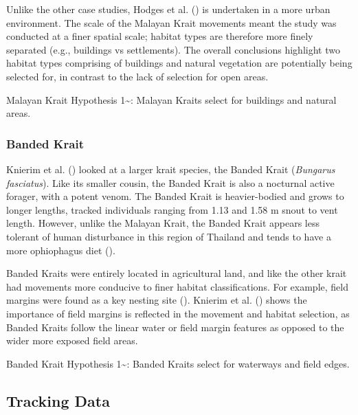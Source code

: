 \documentclass[10pt,a4paper]{article}
\begin{document}
Unlike the other case studies, Hodges et al. () is undertaken in a more urban environment.
The scale of the Malayan Krait movements meant the study was conducted at a finer spatial scale; habitat types are therefore more finely separated (e.g., buildings vs settlements).
The overall conclusions highlight two habitat types comprising of buildings and natural vegetation are potentially being selected for, in contrast to the lack of selection for open areas.

Malayan Krait Hypothesis 1\textasciitilde: Malayan Kraits select for buildings and natural areas.

\subsubsection{Banded Krait}\label{banded-krait}

Knierim et al. () looked at a larger krait species, the Banded Krait (\emph{Bungarus fasciatus}).
Like its smaller cousin, the Banded Krait is also a nocturnal active forager, with a potent venom.
The Banded Krait is heavier-bodied and grows to longer lengths, tracked individuals ranging from 1.13 and 1.58 m snout to vent length.
However, unlike the Malayan Krait, the Banded Krait appears less tolerant of human disturbance in this region of Thailand and tends to have a more ophiophagus diet ().

Banded Kraits were entirely located in agricultural land, and like the other krait had movements more conducive to finer habitat classifications.
For example, field margins were found as a key nesting site ().
Knierim et al. () shows the importance of field margins is reflected in the movement and habitat selection, as Banded Kraits follow the linear water or field margin features as opposed to the wider more exposed field areas.

Banded Krait Hypothesis 1\textasciitilde: Banded Kraits select for waterways and field edges.

\subsection{Tracking Data}\label{tracking-data}
\end{document}
